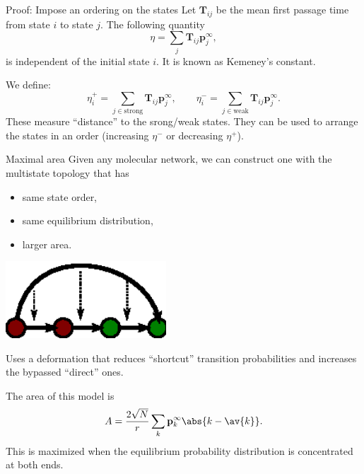 \documentclass[final,hyperref={pdfpagelabels=false,bookmarks=false}]{beamer}
\newcommand{\citerr}[1]{\hfill {\footnotesize{\color{darkgrey}\cite{#1}}}}
\newcommand{\net}{molecular network}
\newcommand{\eq}{\mathbf{p}^\infty}
\newcommand{\fpt}{\mathbf{T}}
\begin{document}
\begin{frame}{}
\begin{columns}[t]
\begin{column}{0.37\linewidth}

\begin{block}{Proof: Impose an ordering on the states}
%
 Let $\fpt_{ij}$ be the mean first passage time from state $i$ to state $j$.
 The following quantity
 \begin{equation*}
   \eta = \sum_j \fpt_{ij} \eq_j,
 \end{equation*}
 is independent of the initial state $i$.
 It is known as Kemeney's constant. \citerr{kemeny1960finite}

 \vp We define:
 \begin{equation*}
   \eta^+_i = \sum_{j\in\text{strong}} \fpt_{ij} \eq_j,
   \qquad
   \eta^-_i = \sum_{j\in\text{weak}} \fpt_{ij} \eq_j.
 \end{equation*}
 These measure ``distance'' to the srong/weak states.
 They can be used to arrange the states in an order (increasing $\eta^-$ or decreasing $\eta^+$).
%
\end{block}


\begin{block}{Maximal area}
%
 Given any \net, we can construct one with the multistate topology that has
 \parbox[c]{15cm}{
  \begin{itemize}
    \item same state order,
    \item same equilibrium distribution,
    \item larger area.
  \end{itemize}
 }
 \parbox[c]{15cm}{
  \begin{center}
    \includegraphics[width=6cm]{shortcut.eps}
  \end{center}
 }

 Uses a deformation that reduces ``shortcut'' transition probabilities and increases the bypassed ``direct'' ones.

 \vp The area of this model is
 \begin{equation*}
   A = \frac{2\sqrt{N}}{r}\sum_k \eq_k \abs{k-\av{k}}.
 \end{equation*}
 This is maximized when the equilibrium probability distribution is concentrated at both ends.
%
\end{block}






\end{column}
\end{columns}
\end{frame}
\end{document}
